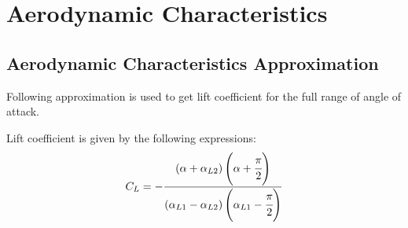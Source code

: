 \chapter{Aerodynamic Characteristics}

\section{Aerodynamic Characteristics Approximation}

Following approximation is used to get lift coefficient for the full range of angle of attack. \cite{NASA-TM-102267}

Lift coefficient is given by the following expressions:
\begin{align}
  C_L =
  -
  \frac{
    \left( \alpha + \alpha_{L2} \right)
    \left( \alpha + \cfrac{\pi}{2} \right) 
  }
  {
    \left( \alpha_{L1} - \alpha_{L2} \right)
    \left( \alpha_{L1} - \cfrac{\pi}{2} \right) 
  }
\end{align}
